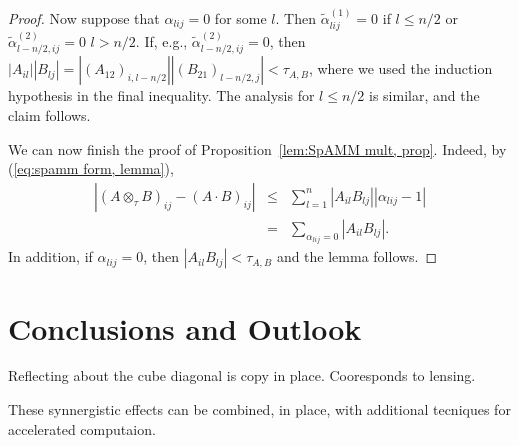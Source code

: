 \documentclass[letterpaper,twocolumn,amsmath,amsfont,amssymb,english,aps,jcp,preprintnumbers,groupaddress,nofootinbib,tightenlines,floatfix]{revtex4}
\theoremstyle{plain}
\theoremstyle{remark}
\theoremstyle{plain}
\begin{document}
\begin{proof}
Now suppose that $\alpha_{lij}=0$ for some $l$. Then $\tilde{\alpha}_{lij}^{(1)}=0$
if $l\leq n/2$ or $\tilde{\alpha}_{l-n/2,ij}^{(2)}=0$ $l>n/2$.
If, e.g., $\tilde{\alpha}_{l-n/2,ij}^{(2)}=0$, then $\left|A_{il}\right|\left|B_{lj}\right|=\left|\left(A_{12}\right)_{i,l-n/2}\right|\left|\left(B_{21}\right)_{l-n/2,j}\right|<\tau_{A,B}$,
where we used the induction hypothesis in the final inequality. The
analysis for $l\leq n/2$ is similar, and the claim
follows.

We can now finish the proof of Proposition~\ref{lem:SpAMM mult, prop}. Indeed, by (\ref{eq:spamm form, lemma}),
\begin{eqnarray*}
\left|\left(A\otimes_{\tau}B\right)_{ij}-\left(A\cdot B\right)_{ij}\right| & \leq & \sum_{l=1}^{n}\left|A_{il}B_{lj}\right|\left|\alpha_{lij}-1\right|\\
 & = & \sum_{\alpha_{lij}=0}\left|A_{il}B_{lj}\right|.
\end{eqnarray*}
In addition, if $\alpha_{lij}=0$, then $\left|A_{il}B_{lj}\right|<\tau_{A,B}$
and the lemma follows.


\end{proof}




\section{Conclusions and Outlook}

Reflecting about the cube diagonal is copy in place.  Cooresponds to lensing.

These  synnergistic effects can be combined, in place, with additional tecniques for 
accelerated computaion.



\end{document}
